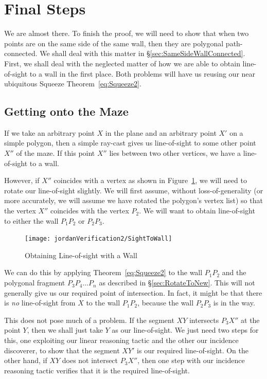 \section{Final Steps}
We are almost there. To finish the proof, we will need to show that when two points are on the same side of the same wall, then they are polygonal path-connected. We shall deal with this matter in \S\ref{sec:SameSideWallConnected}. First, we shall deal with the neglected matter of how we are able to obtain line-of-sight to a wall in the first place. Both problems will have us reusing our near ubiquitous Squeeze Theorem~\eqref{eq:Squeeze2}.

\subsection{Getting onto the Maze}
If we take an arbitrary point $X$ in the plane and an arbitrary point $X'$ on a simple polygon, then a simple ray-cast gives us line-of-sight to some other point $X''$ of the maze. If this point $X''$ lies between two other vertices, we have a line-of-sight to a wall. 

However, if $X''$ coincides with a vertex as shown in Figure~\ref{fig:SightToWall}, we will need to rotate our line-of-sight slightly. We will first assume, without loss-of-generality (or more accurately, we will assume we have rotated the polygon's vertex list) so that the vertex $X''$ coincides with the vertex $P_2$. We will want to obtain line-of-sight to either the wall $P_1P_2$ or $P_2P_3$.

\begin{figure}
  \centering\texttt{[image: jordanVerification2/SightToWall]}
  \caption{Obtaining Line-of-sight with a Wall}
  \label{fig:SightToWall}
\end{figure}

We can do this by applying Theorem~\ref{eq:Squeeze2} to the wall $P_1P_2$ and the polygonal fragment $P_3P_4\ldots P_n$ as described in \S\ref{sec:RotateToNew}. This will not generally give us our required point of intersection. In fact, it might be that there is \emph{no} line-of-sight from $X$ to the wall $P_1P_2$, because the wall $P_2P_3$ is in the way. 

This does not pose much of a problem. If the segment $XY$ intersects $P_3X''$ at the point $Y$, then we shall just take $Y$ as our line-of-sight. We just need two steps for this, one exploiting our linear reasoning tactic and the other our incidence discoverer, to show that the segment $XY'$ is our required line-of-sight. On the other hand, if $XY$ does not intersect $P_3X''$, then one step with our incidence reasoning tactic verifies that it is the required line-of-sight. 


